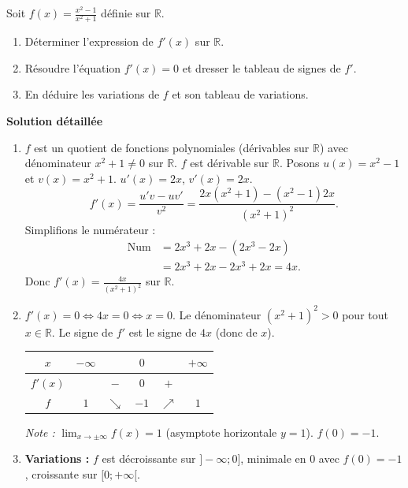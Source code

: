 \documentclass[11pt]{article}
\begin{document}
\begin{exoresolu}
Soit $f(x) = \frac{x^2-1}{x^2+1}$ définie sur $\mathbb{R}$.
\begin{enumerate}
    \item Déterminer l'expression de $f'(x)$ sur $\mathbb{R}$.
    \item Résoudre l'équation $f'(x) = 0$ et dresser le tableau de signes de $f'$.
    \item En déduire les variations de $f$ et son tableau de variations.
\end{enumerate}
\tcblower
\textbf{Solution détaillée}
\begin{enumerate}
    \item $f$ est un quotient de fonctions polynomiales (dérivables sur $\mathbb{R}$) avec dénominateur $x^2+1 \neq 0$ sur $\mathbb{R}$. $f$ est dérivable sur $\mathbb{R}$.
    Posons $u(x)=x^2-1$ et $v(x)=x^2+1$. $u'(x)=2x$, $v'(x)=2x$.
    \[
    f'(x) = \frac{u'v - uv'}{v^2} = \frac{2x(x^2+1) - (x^2-1)2x}{(x^2+1)^2}.
    \]
    Simplifions le numérateur :
    \begin{align*}
    \text{Num} &= 2x^3 + 2x - (2x^3 - 2x) \\
    &= 2x^3 + 2x - 2x^3 + 2x = 4x.
    \end{align*}
    Donc \textbf{$f'(x) = \frac{4x}{(x^2+1)^2}$} sur $\mathbb{R}$.
    
    \item $f'(x) = 0 \iff 4x = 0 \iff x = 0$.
    Le dénominateur $(x^2+1)^2 > 0$ pour tout $x \in \mathbb{R}$.
    Le signe de $f'$ est le signe de $4x$ (donc de $x$).
    \begin{center}
    \begin{tabular}{|c|ccccc|}\hline
    $x$ & $-\infty$ & & $0$ & & $+\infty$ \\ \hline
    $f'(x)$ & & $-$ & $0$ & $+$ & \\ \hline
    $f$ & $1$ & $\searrow$ & $-1$ & $\nearrow$ & $1$ \\ \hline
    \end{tabular}
    \end{center}
    \textit{Note :} $\lim_{x\to\pm\infty} f(x) = 1$ (asymptote horizontale $y=1$). $f(0)=-1$.
    
    \item \textbf{Variations :} $f$ est décroissante sur $]-\infty; 0]$, minimale en $0$ avec $f(0)=-1$, croissante sur $[0; +\infty[$.
\end{enumerate}
\end{exoresolu}
\end{document}
